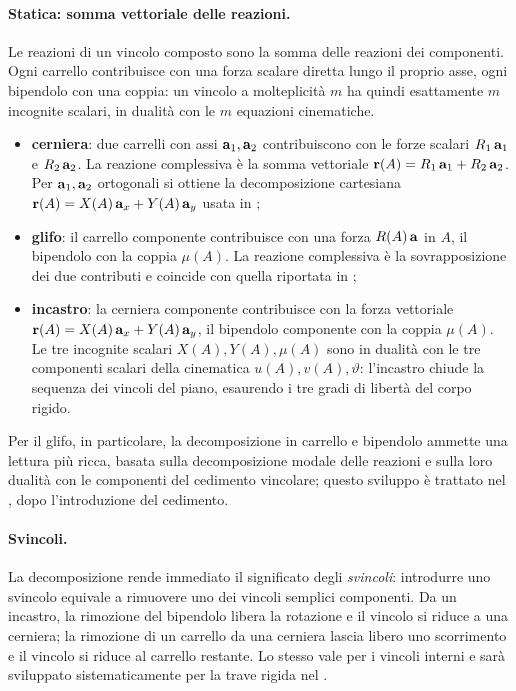 
\paragraph{Statica: somma vettoriale delle reazioni.}
Le reazioni di un vincolo composto sono la somma delle 
reazioni dei componenti. Ogni carrello contribuisce con 
una forza scalare diretta lungo il proprio asse, ogni 
bipendolo con una coppia: un vincolo a molteplicità $m$ 
ha quindi esattamente $m$ incognite scalari, in dualità 
con le $m$ equazioni cinematiche.
\begin{itemize}[noitemsep]
	\item \textbf{cerniera}: due carrelli con assi $\mathbf{a}_1, \mathbf{a}_2$
	contribuiscono con le forze scalari $R_1\,\mathbf{a}_1$ e
	$R_2\,\mathbf{a}_2$. La reazione complessiva è la somma vettoriale
	$\mathbf{r}(A) = R_1\,\mathbf{a}_1 + R_2\,\mathbf{a}_2$. Per $\mathbf{a}_1, \mathbf{a}_2$
	ortogonali si ottiene la decomposizione cartesiana
	$\mathbf{r}(A) = X(A)\,\mathbf{a}_x + Y(A)\,\mathbf{a}_y$ usata in
	;
	
	\item \textbf{glifo}: il carrello componente contribuisce
	con una forza $R(A)\,\mathbf{a}$ in $A$, il bipendolo con la
	coppia $\mu(A)$. La reazione complessiva è la sovrapposizione
	dei due contributi e coincide con quella riportata in
	;
	
	\item \textbf{incastro}: la cerniera componente contribuisce
	con la forza vettoriale $\mathbf{r}(A) = X(A)\,\mathbf{a}_x + Y(A)\,\mathbf{a}_y$,
	il bipendolo componente con la coppia $\mu(A)$. Le tre
	incognite scalari $X(A), Y(A), \mu(A)$ sono in dualità con
	le tre componenti scalari della cinematica
	$u(A), v(A), \vartheta$: l'incastro chiude la sequenza dei
	vincoli del piano, esaurendo i tre gradi di libertà del
	corpo rigido.
\end{itemize}

Per il glifo, in particolare, la decomposizione in carrello e 
bipendolo ammette una lettura più ricca, basata sulla 
decomposizione modale delle reazioni e sulla loro dualità con 
le componenti del cedimento vincolare; questo sviluppo è 
trattato nel , dopo
l'introduzione del cedimento.

\paragraph{Svincoli.}
La decomposizione rende immediato il significato degli 
\emph{svincoli}: introdurre uno svincolo equivale a rimuovere 
uno dei vincoli semplici componenti. Da un incastro, la 
rimozione del bipendolo libera la rotazione e il vincolo si 
riduce a una cerniera; la rimozione di un carrello da una 
cerniera lascia libero uno scorrimento e il vincolo si riduce 
al carrello restante. Lo stesso vale per i vincoli interni e 
sarà sviluppato sistematicamente per la trave rigida nel .



